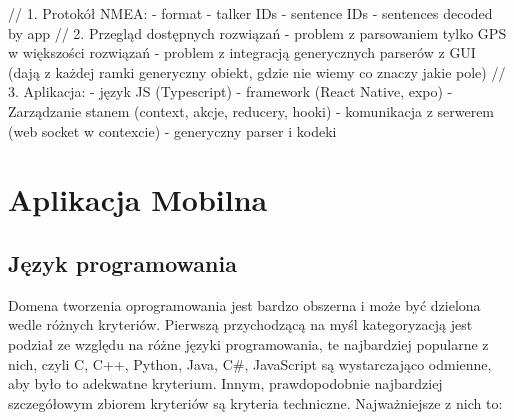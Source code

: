 \documentclass[skorowidz,skroty]{dyplomWEZUT}
\begin{document}
// 1. Protokół NMEA:
	- format
	- talker IDs
	- sentence IDs
	- sentences decoded by app
// 2. Przegląd dostępnych rozwiązań
	- problem z parsowaniem tylko GPS w większości rozwiązań
	- problem z integracją generycznych parserów z GUI (dają z każdej ramki generyczny obiekt, gdzie nie wiemy co znaczy jakie pole)
// 3. Aplikacja:
	- język JS (Typescript)
	- framework (React Native, expo)
	- Zarządzanie stanem (context, akcje, reducery, hooki)
	- komunikacja z serwerem (web socket w contexcie)
	- generyczny parser i kodeki
	

\chapter{Aplikacja Mobilna}\label{chap:Mobile App}

\section{Język programowania}\label{sec: language}
Domena tworzenia oprogramowania jest bardzo obszerna i może być dzielona wedle różnych kryteriów. Pierwszą przychodzącą na myśl kategoryzacją jest podział ze względu na różne języki programowania, te najbardziej popularne z nich, czyli C, C++, Python, Java, C\#, JavaScript są wystarczająco odmienne, aby było to adekwatne kryterium. Innym, prawdopodobnie najbardziej szczegółowym zbiorem kryteriów są kryteria techniczne. Najważniejsze z nich to:
\end{document}
